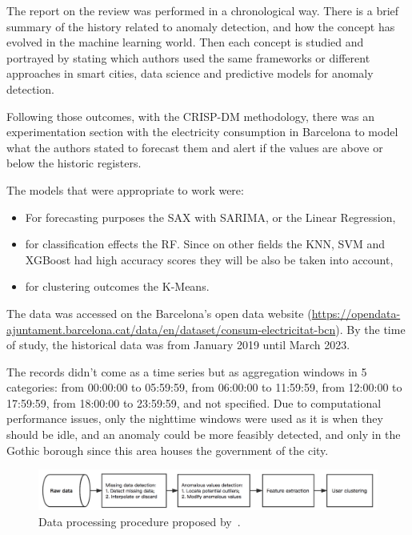 \documentclass[a4paper,12pt,twoside]{ThesisStyle}
\begin{document}
The report on the review was performed in a chronological way. There is a brief summary of the history related to anomaly detection, and how the concept has evolved in the machine learning world. Then each concept is studied and portrayed by stating which authors used the same frameworks or different approaches in smart cities, data science and predictive models for anomaly detection.

Following those outcomes, with the CRISP-DM methodology, there was an experimentation section with the electricity consumption in Barcelona to model what the authors stated to forecast them and alert if the values are above or below the historic registers. 

The models that were appropriate to work were:
\begin{itemize}
  \item For forecasting purposes the SAX with SARIMA, or the Linear Regression,
  \item for classification effects the RF. Since on other fields the KNN, SVM and XGBoost had high accuracy scores they will be also be taken into account,
  \item for clustering outcomes the K-Means.
\end{itemize}

\sloppy The data was accessed on the Barcelona's open data website (\url{https://opendata-ajuntament.barcelona.cat/data/en/dataset/consum-electricitat-bcn}). By the time of study, the historical data was from January 2019 until March 2023. 

The records didn't come as a time series but as aggregation windows in 5 categories: from 00:00:00 to 05:59:59, from 06:00:00 to 11:59:59, from 12:00:00 to 17:59:59, from 18:00:00 to 23:59:59, and not specified. Due to computational performance issues, only the nighttime windows were used as it is when they should be idle, and an anomaly could be more feasibly detected, and only in the Gothic borough since this area houses the government of the city.

\begin{figure}[hbt]
\centering
\includegraphics[width=13 cm]{imatges/dataProcessing.png}
\caption{\label{fig:dataProcessing} Data processing procedure proposed by~\cite{du2019clustering}.}
\end{figure}
\end{document}
